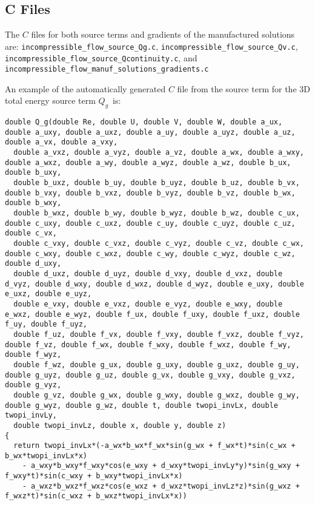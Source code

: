 \documentclass[10pt]{article}
\begin{document}
\begin{landscape}
\subsection{C Files}
The $C$ files for both source terms and gradients of the  manufactured solutions are: \texttt{incompressible\_flow\_source\_Qg.c},  \texttt{incompressible\_flow\_source\_Qv.c},  \texttt{incompressible\_flow\_source\_Qcontinuity.c}, and   \texttt{incompressible\_flow\_manuf\_solutions\_gradients.c}


An example of the automatically generated $C$ file from the source term for the 3D total energy source term $Q_{g}$~is:

\begin{footnotesize}
\begin{verbatim}
double Q_g(double Re, double U, double V, double W, double a_ux, double a_uxy, double a_uxz, double a_uy, double a_uyz, double a_uz, double a_vx, double a_vxy, 
  double a_vxz, double a_vyz, double a_vz, double a_wx, double a_wxy, double a_wxz, double a_wy, double a_wyz, double a_wz, double b_ux, double b_uxy, 
  double b_uxz, double b_uy, double b_uyz, double b_uz, double b_vx, double b_vxy, double b_vxz, double b_vyz, double b_vz, double b_wx, double b_wxy, 
  double b_wxz, double b_wy, double b_wyz, double b_wz, double c_ux, double c_uxy, double c_uxz, double c_uy, double c_uyz, double c_uz, double c_vx, 
  double c_vxy, double c_vxz, double c_vyz, double c_vz, double c_wx, double c_wxy, double c_wxz, double c_wy, double c_wyz, double c_wz, double d_uxy, 
  double d_uxz, double d_uyz, double d_vxy, double d_vxz, double d_vyz, double d_wxy, double d_wxz, double d_wyz, double e_uxy, double e_uxz, double e_uyz, 
  double e_vxy, double e_vxz, double e_vyz, double e_wxy, double e_wxz, double e_wyz, double f_ux, double f_uxy, double f_uxz, double f_uy, double f_uyz, 
  double f_uz, double f_vx, double f_vxy, double f_vxz, double f_vyz, double f_vz, double f_wx, double f_wxy, double f_wxz, double f_wy, double f_wyz, 
  double f_wz, double g_ux, double g_uxy, double g_uxz, double g_uy, double g_uyz, double g_uz, double g_vx, double g_vxy, double g_vxz, double g_vyz, 
  double g_vz, double g_wx, double g_wxy, double g_wxz, double g_wy, double g_wyz, double g_wz, double t, double twopi_invLx, double twopi_invLy, 
  double twopi_invLz, double x, double y, double z) 
{
  return twopi_invLx*(-a_wx*b_wx*f_wx*sin(g_wx + f_wx*t)*sin(c_wx + b_wx*twopi_invLx*x) 
    - a_wxy*b_wxy*f_wxy*cos(e_wxy + d_wxy*twopi_invLy*y)*sin(g_wxy + f_wxy*t)*sin(c_wxy + b_wxy*twopi_invLx*x) 
    - a_wxz*b_wxz*f_wxz*cos(e_wxz + d_wxz*twopi_invLz*z)*sin(g_wxz + f_wxz*t)*sin(c_wxz + b_wxz*twopi_invLx*x)) 

\end{verbatim}
\end{footnotesize}
\end{landscape}
\end{document}
